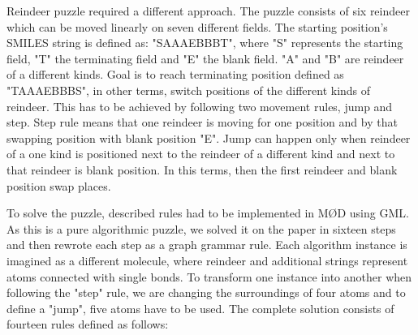 \documentclass[a4paper,10pt,titlepage]{report}
\begin{document}
Reindeer puzzle required a different approach. The puzzle consists of six reindeer which can be moved linearly on seven different fields. The starting position's SMILES string is defined as: "SAAAEBBBT", where "S" represents the starting field, "T" the terminating field and "E" the blank field. "A" and "B" are reindeer of a different kinds. Goal is to reach terminating position defined as "TAAAEBBBS", in other terms, switch positions of the different kinds of reindeer. This has to be achieved by following two movement rules, jump and step. Step rule means that one reindeer is moving for one position and by that swapping position with blank position "E". Jump can happen only when reindeer of a one kind is positioned next to the reindeer of a different kind and next to that reindeer is blank position. In this terms, then the first reindeer and blank position swap places. 

To solve the puzzle, described rules had to be implemented in MØD using GML. As this is a pure algorithmic puzzle, we solved it on the paper in sixteen steps and then rewrote each step as a graph grammar rule. Each algorithm instance is imagined as a different molecule, where reindeer and additional strings represent atoms connected with single bonds. To transform one instance into another when following the "step" rule, we are changing the surroundings of four atoms and to define a "jump", five atoms have to be used. The complete solution consists of fourteen rules defined as follows:
\end{document}

